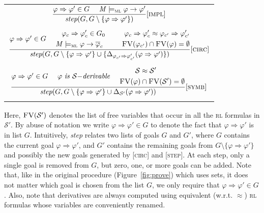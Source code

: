 \documentclass[conference]{IEEEtran}
\newcommand{\M}{\mathit{M}}
\renewcommand{\S}{\mathcal{S}}
\newcommand{\Ra}{\Rightarrow}
\newcommand{\FreeVars}{\mathit{\textsc{FV}}}
\renewcommand{\implies}{\rightarrow}
\newcommand{\ML}{\textsc{ml}\xspace}
\newcommand{\RL}{\textsc{rl}\xspace}
\newcommand{\rrule}[2]{{#1} \Ra{#2}}
\newcommand{\modelsml}{\models_\ML}
\newcommand{\coq}[1]{{\small \textit{#1}}}
\begin{document}
\begin{center}
\begin{tabular}{c}
$\dfrac{\rrule{\varphi}{\varphi'} \in G ~~~~ \M\modelsml \varphi \implies \varphi'}{\coq{step}(G,G \setminus \{\rrule{\varphi}{\varphi'}\})}{[\textsc{impl}]}$\\\\
$\dfrac{\rrule{\varphi}{\varphi'} \in G ~~~~
\begin{aligned}
\rrule{\varphi_c}{\varphi'_c} \in G_0~~~~~~~~\rrule{\varphi_c}{\varphi'_c} \approx \rrule{\varphi_{c'}}{\varphi'_{c'}}\\\M\modelsml \varphi \implies \overline{\varphi}_{c}~~~~~~~~\FreeVars(\varphi_{c'}) \cap \FreeVars(\varphi) = \emptyset
\end{aligned}}
{\coq{step}(G, G \setminus \{\rrule{\varphi}{\varphi'}\} \cup \{ \Delta_{\rrule{\varphi_{c'}}{\varphi'_{c'}}}(\rrule{\varphi}{\varphi'}) \})}{[\textsc{circ}]}$\\\\
$\dfrac{\rrule{\varphi}{\varphi'} \in G ~~~~ \varphi~\mathit{is}~\S\mathit{-derivable} ~~~~ 
\begin{aligned}
\S \approx \S' ~~~~~~~~~~~~\\
 \FreeVars(\varphi) \cap \FreeVars(\S') = \emptyset
\end{aligned}
}
{\coq{step}(G, G \setminus \{\rrule{\varphi}{\varphi'}\} \cup \Delta_{\S'}(\rrule{\varphi}{\varphi'}))}{[\textsc{symb}]}$\\\\
\end{tabular}
\end{center}

\noindent
Here, $\FreeVars(\S')$ denotes the list of free variables that occur in all the \RL formulas in $\S'$. 
By abuse of notation we write $\rrule{\varphi}{\varphi'} \in G$ to denote the fact that $\rrule{\varphi}{\varphi'}$ is in list $G$.
Intuitively, \coq{step} relates two lists of goals $G$ and $G'$, where $G$ contains the current goal $\rrule{\varphi}{\varphi'}$, and $G'$ contains the remaining goals from $G \setminus \{\rrule{\varphi}{\varphi'}\}$ and possibly the new goals generated by [\textsc{circ}] and [\textsc{step}].
At each step, only a single goal is removed from $G$, but zero, one, or more goals can be added. 
Note that, like in the original procedure (Figure~\ref{fig:prove}) which uses sets, it does not matter which goal is chosen from the list $G$, we only require that $\rrule{\varphi}{\varphi'} \in G$.
Also, note that derivatives are always computed using equivalent (w.r.t. $\approx$) \RL formulas whose variables are conveniently renamed.
\end{document}
